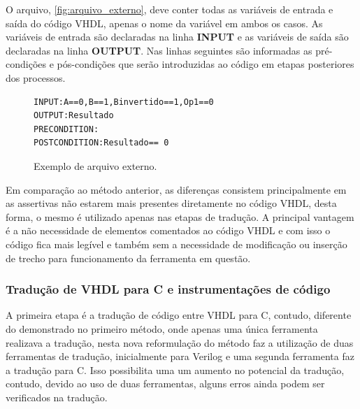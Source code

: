 \par
O arquivo, \autoref{fig:arquivo_externo}, deve conter todas as variáveis de entrada e saída do código VHDL, apenas o nome da variável em ambos os casos. As variáveis de entrada são declaradas na linha \textbf{INPUT} e as variáveis de saída são declaradas na linha \textbf{OUTPUT}. Nas linhas seguintes são informadas as pré-condições e pós-condições que serão introduzidas ao código em etapas posteriores dos processos.

\begin{figure}[H]
\caption{\label{fig:arquivo_externo} Exemplo de arquivo externo.}
	\begin{center}
    \begin{minipage}{0.8\textwidth}
    \begin{lstlisting}       
INPUT:A==0,B==1,Binvertido==1,Op1==0
OUTPUT:Resultado
PRECONDITION:
POSTCONDITION:Resultado== 0
    \end{lstlisting}
    \end{minipage}
	\end{center}
\end{figure}

\par
Em comparação ao método anterior, as diferenças consistem principalmente em as assertivas não estarem mais presentes diretamente no código VHDL, desta forma, o mesmo é utilizado apenas nas etapas de tradução. A principal vantagem é a não necessidade de elementos comentados ao código VHDL e com isso o código fica mais legível e também sem a necessidade de modificação ou inserção de trecho para funcionamento da ferramenta em questão.

\subsubsection{\label{cap:traducao}Tradução de VHDL para C e instrumentações de código}

\par
A primeira etapa é a tradução de código entre VHDL para C, contudo, diferente do demonstrado no primeiro método, onde apenas uma única ferramenta realizava a tradução, nesta nova reformulação do método faz a utilização de duas ferramentas de tradução, inicialmente para Verilog e uma segunda ferramenta faz a tradução para C. Isso possibilita uma um aumento no potencial da tradução, contudo, devido ao uso de duas ferramentas, alguns erros ainda podem ser verificados na tradução.

